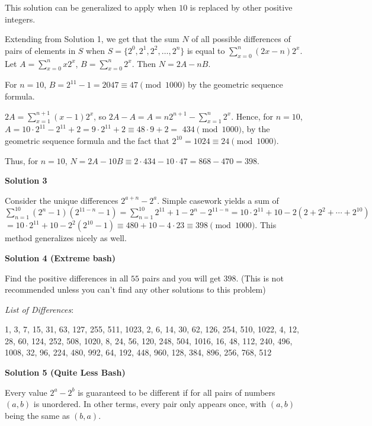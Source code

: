 \begin{enumerate}
This solution can be generalized to apply when $10$ is replaced by other positive integers.

 Extending from Solution 1, we get that the sum $N$ of all possible differences of pairs of elements in $S$ when $S = \{2^0,2^1,2^2,\ldots,2^{n}\}$ is equal to $\sum_{x=0}^{n} (2x-n) 2^x$. Let $A = \sum_{x=0}^{n} x2^x$, $B=\sum_{x=0}^{n} 2^x$. Then $N=2A - nB$.

 For $n = 10$, $B = 2^{11}-1 = 2047 \equiv 47 \pmod{1000}$ by the geometric sequence formula. 

 $2A = \sum_{x=1}^{n+1} (x-1)2^x$, so $2A - A = A = n2^{n+1} - \sum_{x=1}^{n} 2^x$. Hence, for $n = 10$, $A = 10 \cdot 2^{11} - 2^{11} + 2 = 9 \cdot 2^{11} + 2 \equiv 48 \cdot 9 + 2 =$
$434 \pmod{1000}$, by the geometric sequence formula and the fact that $2^{10} = 1024 \equiv 24 \pmod{1000}$.

 Thus, for $n = 10$, $N = 2A - 10B \equiv 2\cdot 434 - 10\cdot 47 = 868 - 470 = \boxed{398}$.

 



\textbf{Solution 3}

Consider the unique differences $2^{a + n} - 2^a$. Simple casework yields a sum of $\sum_{n = 1}^{10}(2^n - 1)(2^{11 - n} - 1) = \sum_{n = 1}^{10}2^{11} + 1 - 2^n - 2^{11 - n} = 10\cdot2^{11} + 10 - 2(2 + 2^2 + \cdots + 2^{10})$$= 10\cdot2^{11} + 10 - 2^2(2^{10} - 1)\equiv480 + 10 - 4\cdot23\equiv\boxed{398}\pmod{1000}$. This method generalizes nicely as well.

 



\textbf{Solution 4 (Extreme bash)}

Find the positive differences in all $55$ pairs and you will get $\boxed{398}$. (This is not recommended unless you can't find any other solutions to this problem)

 \textit{List of Differences}:

 1, 3, 7, 15, 31, 63, 127, 255, 511, 1023, 2, 6, 14, 30, 62, 126, 254, 510, 1022, 4, 12, 28, 60, 124, 252, 508, 1020, 8, 24, 56, 120, 248, 504, 1016, 16, 48, 112, 240, 496, 1008, 32, 96, 224, 480, 992, 64, 192, 448, 960, 128, 384, 896, 256, 768, 512

 



\textbf{Solution 5 (Quite Less Bash)}

Every value $2^a - 2^b$ is guaranteed to be different if for all pairs of numbers $(a,b)$ is unordered. In other terms, every pair only appears once, with $(a,b)$ being the same as $(b,a)$.


\end{enumerate}
